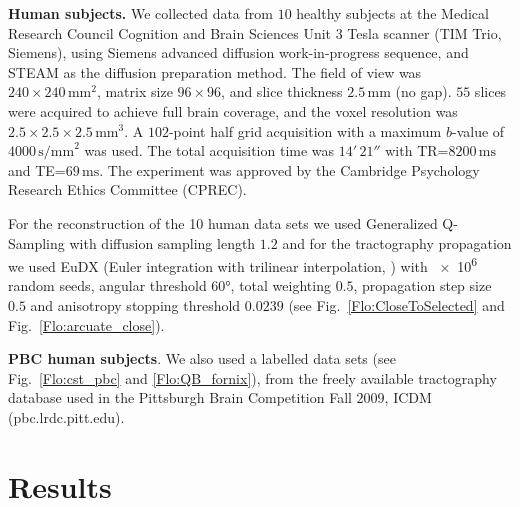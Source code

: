 \documentclass{bioinfo}
\begin{document}
\begin{methods}
\textbf{Human subjects.} We collected data from $10$ healthy subjects at
the Medical Research Council Cognition and Brain Sciences Unit 3 Tesla scanner
(TIM Trio, Siemens), using Siemens advanced diffusion work-in-progress sequence,
and STEAM \citep{merboldt1992diffusion,MAB04} as the diffusion preparation
method. The field of view was $240\times240\,\textrm{mm}^{2}$, matrix size
$96\times96$, and slice thickness $2.5\,\textrm{mm}$ (no gap).  $55$ slices were
acquired to achieve full brain coverage, and the voxel resolution was
$2.5\times2.5\times2.5\,\textrm{mm}^{3}$. A $102$-point half grid acquisition
\citep{Yeh2010} with a maximum $b$-value of $4000\, \textrm{s/mm}^{2}$ was used.
The total acquisition time was $14'\,21''$ with TR=$8200\,\textrm{ms}$ and
TE=$69\,\textrm{ms}$. The experiment was approved by the Cambridge Psychology
Research Ethics Committee (CPREC).

For the reconstruction of the 10 human data sets we used Generalized
Q-Sampling \citep{Yeh2010} with diffusion sampling length $1.2$ and for
the tractography propagation we used EuDX (Euler integration with
trilinear interpolation, \citep{Garyfallidis_thesis}) with \num{e6}
random seeds, angular threshold \ang{60}, total weighting $0.5$,
propagation step size $0.5$ and anisotropy stopping threshold $0.0239$
(see Fig.~\ref{Flo:CloseToSelected} and Fig.~\ref{Flo:arcuate_close}).

\textbf{PBC human subjects}. We also used a labelled data sets (see
Fig.~\ref{Flo:cst_pbc} and \ref{Flo:QB_fornix}), from the freely available
tractography database used in the Pittsburgh Brain Competition Fall
$2009$, ICDM (pbc.lrdc.pitt.edu).

\end{methods}

\section{Results}
\end{document}
